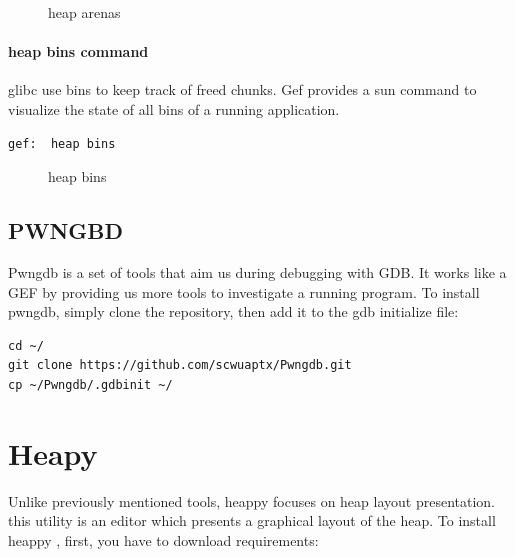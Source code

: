 \documentclass{masterthesis}
\newcommand*\libc{glibc}
\begin{document}
 \begin{figure}[h!]
  \caption{heap arenas}
\end{figure}

\paragraph{heap bins command}
\libc{} use bins to keep track of freed chunks. Gef provides a sun command to visualize the state of all bins of a running application.
\begin{lstlisting}[frame=tlrb]
gef:  heap bins
\end{lstlisting}

 \begin{figure}[h!]
  \caption{heap bins}
\end{figure}

\subsection{PWNGBD}
Pwngdb is a set of tools that aim us during debugging with GDB. It works like a GEF by providing us more tools to investigate a running program.
To install pwngdb, simply clone the repository, then add it to the gdb initialize file:
\begin{lstlisting}[frame=tlrb]
cd ~/
git clone https://github.com/scwuaptx/Pwngdb.git 
cp ~/Pwngdb/.gdbinit ~/
\end{lstlisting}

\section{Heapy}
Unlike previously mentioned tools, heappy focuses on heap layout presentation. this utility is an editor which presents a graphical layout of the heap. To install heappy , first, you have to download requirements:
\end{document}
